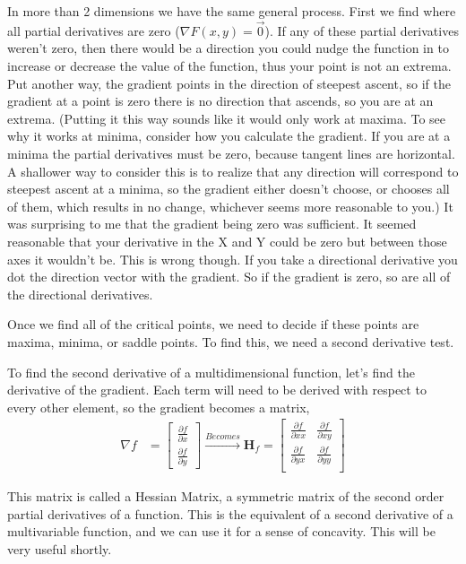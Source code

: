 \documentclass[12pt, letterpaper]{article}
\begin{document}
In more than 2 dimensions we have the same general process. First we find where all partial derivatives are zero ($\nabla F(x, y) = \vec{0}$). If any of these partial derivatives weren't zero, then there would be a direction you could nudge the function in to increase or decrease the value of the function, thus your point is not an extrema. 
Put another way, the gradient points in the direction of steepest ascent, so if the gradient at a point is zero there is no direction that ascends, so you are at an extrema.
(Putting it this way sounds like it would only work at maxima. To see why it works at minima, consider how you calculate the gradient. If you are at a minima the partial derivatives must be zero, because tangent lines are horizontal. A shallower way to consider this is to realize that any direction will correspond to steepest ascent at a minima, so the gradient either doesn't choose, or chooses all of them, which results in no change, whichever seems more reasonable to you.) 
It was surprising to me that the gradient being zero was sufficient. It seemed reasonable that your derivative in the X and Y could be zero but between those axes it wouldn't be. This is wrong though. If you take a directional derivative you dot the direction vector with the gradient. So if the gradient is zero, so are all of the directional derivatives. 

Once we find all of the critical points, we need to decide if these points are maxima, minima, or saddle points. To find this, we need a second derivative test.

To find the second derivative of a multidimensional function, let's find the derivative of the gradient. Each term will need to be derived with respect to every other element, so the gradient becomes a matrix,
\begin{align*}
    \nabla f &= \begin{bmatrix}
        \frac{\partial f}{\partial x}\\
        \frac{\partial f}{\partial y}
    \end{bmatrix}
    \xrightarrow{Becomes}
    \mathbf{H}_f = \begin{bmatrix}
        \frac{\partial f}{\partial xx} & \frac{\partial f}{\partial xy}\\
        \frac{\partial f}{\partial yx} & \frac{\partial f}{\partial yy}\\  
    \end{bmatrix}
\end{align*}

This matrix is called a Hessian Matrix, a symmetric matrix of the second order partial derivatives of a function. 
This is the equivalent of a second derivative of a multivariable function, and we can use it for a sense of concavity.
This will be very useful shortly.
\end{document}
